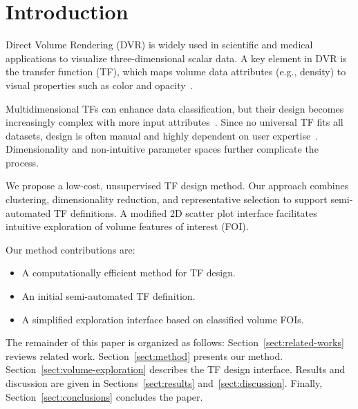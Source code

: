 \section{Introduction}
\label{sect:introduction}

Direct Volume Rendering (DVR) is widely used in scientific and medical applications to visualize three-dimensional scalar data. A key element in DVR is the transfer function (TF), which maps volume data attributes (e.g., density) to visual properties such as color and opacity~\cite{ljung2016}.

Multidimensional TFs can enhance data classification, but their design becomes increasingly complex with more input attributes~\cite{ljung2016, pan2024}. Since no universal TF fits all datasets, design is often manual and highly dependent on user expertise~\cite{arens2010}. Dimensionality and non-intuitive parameter spaces further complicate the process.

We propose a low-cost, unsupervised TF design method. Our approach combines clustering, dimensionality reduction, and representative selection to support semi-automated TF definitions. A modified 2D scatter plot interface facilitates intuitive exploration of volume features of interest (FOI).

Our method contributions are:

\begin{itemize}
    \item A computationally efficient method for TF design.
    \item An initial semi-automated TF definition.
    \item A simplified exploration interface based on classified volume FOIs.
\end{itemize}

The remainder of this paper is organized as follows: Section~\ref{sect:related-works} reviews related work. Section~\ref{sect:method} presents our method. Section~\ref{sect:volume-exploration} describes the TF design interface. Results and discussion are given in Sections~\ref{sect:results} and~\ref{sect:discussion}. Finally, Section~\ref{sect:conclusions} concludes the paper.

